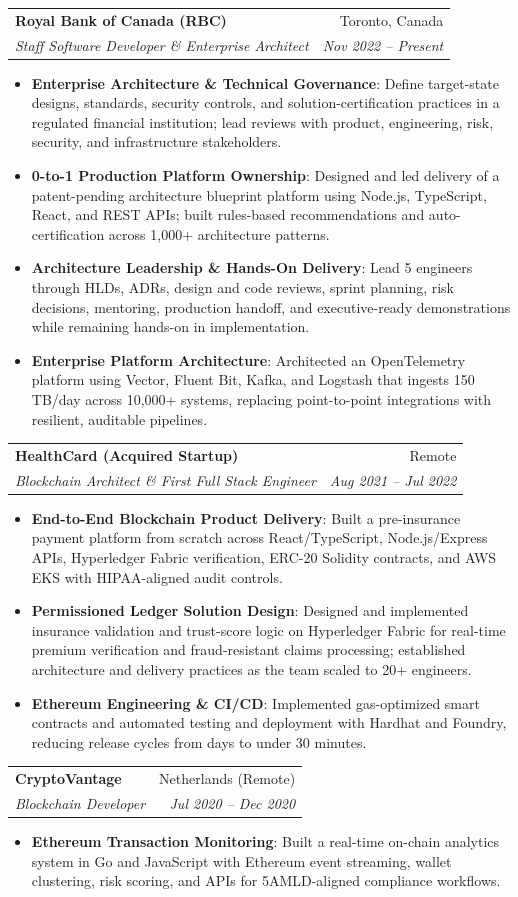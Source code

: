 \documentclass[letterpaper,9.5pt]{article}
\makeatletter
\newcommand{\resumeItem}[2]{\item\small{\textbf{#1}{: #2 \vspace{-2pt}}}}
\newcommand{\resumeSubheading}[4]{\vspace{-2pt}\item\begin{tabular*}{0.97\textwidth}{l@{\extracolsep{\fill}}r}\textbf{#1} & #2 \\\textit{\small#3} & \textit{\small #4} \\\end{tabular*}\vspace{-6pt}}
\newcommand{\resumeItemListStart}{\begin{itemize}}
\newcommand{\resumeItemListEnd}{\end{itemize}\vspace{-6pt}}
\makeatother
\begin{document}
  \resumeSubheading
    {Royal Bank of Canada (RBC)}{Toronto, Canada}
    {Staff Software Developer \& Enterprise Architect}{Nov 2022 -- Present}
  \resumeItemListStart
    \resumeItem{Enterprise Architecture \& Technical Governance}
      {Define target-state designs, standards, security controls, and solution-certification practices in a regulated financial institution; lead reviews with product, engineering, risk, security, and infrastructure stakeholders.}
    \resumeItem{0-to-1 Production Platform Ownership}
      {Designed and led delivery of a patent-pending architecture blueprint platform using Node.js, TypeScript, React, and REST APIs; built rules-based recommendations and auto-certification across 1,000+ architecture patterns.}
    \resumeItem{Architecture Leadership \& Hands-On Delivery}
      {Lead 5 engineers through HLDs, ADRs, design and code reviews, sprint planning, risk decisions, mentoring, production handoff, and executive-ready demonstrations while remaining hands-on in implementation.}
    \resumeItem{Enterprise Platform Architecture}
      {Architected an OpenTelemetry platform using Vector, Fluent Bit, Kafka, and Logstash that ingests 150\,TB/day across 10,000+ systems, replacing point-to-point integrations with resilient, auditable pipelines.}
  \resumeItemListEnd

  \resumeSubheading
    {HealthCard (Acquired Startup)}{Remote}
    {Blockchain Architect \& First Full Stack Engineer}{Aug 2021 -- Jul 2022}
  \resumeItemListStart
    \resumeItem{End-to-End Blockchain Product Delivery}
      {Built a pre-insurance payment platform from scratch across React/TypeScript, Node.js/Express APIs, Hyperledger Fabric verification, ERC-20 Solidity contracts, and AWS EKS with HIPAA-aligned audit controls.}
    \resumeItem{Permissioned Ledger Solution Design}
      {Designed and implemented insurance validation and trust-score logic on Hyperledger Fabric for real-time premium verification and fraud-resistant claims processing; established architecture and delivery practices as the team scaled to 20+ engineers.}
    \resumeItem{Ethereum Engineering \& CI/CD}
      {Implemented gas-optimized smart contracts and automated testing and deployment with Hardhat and Foundry, reducing release cycles from days to under 30 minutes.}
  \resumeItemListEnd

  \resumeSubheading
    {CryptoVantage}{Netherlands (Remote)}
    {Blockchain Developer}{Jul 2020 -- Dec 2020}
  \resumeItemListStart
    \resumeItem{Ethereum Transaction Monitoring}
      {Built a real-time on-chain analytics system in Go and JavaScript with Ethereum event streaming, wallet clustering, risk scoring, and APIs for 5AMLD-aligned compliance workflows.}
  \resumeItemListEnd
\end{document}
